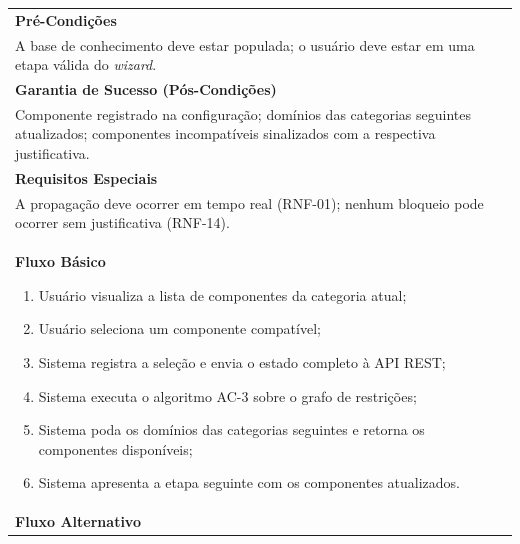 \begin{table}[!htbp]
\begin{tabular}{ | p{15cm} | }
    \textbf{Pré-Condições}                                                                                                                                                                                                                 \\
    A base de conhecimento deve estar populada; o usuário deve estar em uma etapa válida do \textit{wizard}.                                                                                                                               \\	\hline
    \textbf{Garantia de Sucesso (Pós-Condições)}                                                                                                                                                                                           \\
    Componente registrado na configuração; domínios das categorias seguintes atualizados; componentes incompatíveis sinalizados com a respectiva justificativa.                                                                            \\	\hline
    \textbf{Requisitos Especiais}                                                                                                                                                                                                          \\
    A propagação deve ocorrer em tempo real (RNF-01); nenhum bloqueio pode ocorrer sem justificativa (RNF-14).                                                                                                                             \\	\hline
    \textbf{Fluxo Básico}
    \begin{enumerate}
      \item Usuário visualiza a lista de componentes da categoria atual;
      \item Usuário seleciona um componente compatível;
      \item Sistema registra a seleção e envia o estado completo à API REST;
      \item Sistema executa o algoritmo AC-3 sobre o grafo de restrições;
      \item Sistema poda os domínios das categorias seguintes e retorna os componentes disponíveis;
      \item Sistema apresenta a etapa seguinte com os componentes atualizados.
    \end{enumerate}
    \\	\hline
    \textbf{Fluxo Alternativo}

\end{tabular}
\end{table}
